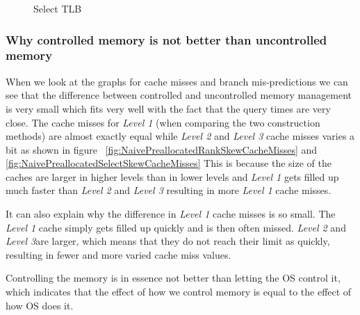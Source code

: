 \begin{figure}
\caption{Select TLB}
\label{fig:NaiveVsPreallocatedSkewSelectQueryTLB}

\end{figure}


\subsubsection{Why controlled memory is not better than uncontrolled memory}
When we look at the graphs for cache misses and branch mis-predictions we can see that the difference between controlled and uncontrolled memory management is very small which fits very well with the fact that the query times are very close.
The cache misses for \textit{Level 1} (when comparing the two construction methods) are almost exactly equal while \textit{Level 2} and \textit{Level 3} cache misses varies a bit as shown in figure ~\ref{fig:NaivePreallocatedRankSkewCacheMisses} and \ref{fig:NaivePreallocatedSelectSkewCacheMisses}
This is because the size of the caches are larger in higher levels than in lower levels and \textit{Level 1} gets filled up much faster than \textit{Level 2} and \textit{Level 3} resulting in more \textit{Level 1} cache misses.

It can also explain why the difference in \textit{Level 1} cache misses is so small. 
The \textit{Level 1} cache simply gets filled up quickly and is then often missed. \textit{Level 2} and \textit{Level 3}are larger, which means that they do not reach their limit as quickly, resulting in fewer and more varied cache miss values.



Controlling the memory is in essence not better than letting the OS control it, which indicates that the effect of how we control memory is equal to the effect of how OS does it.








